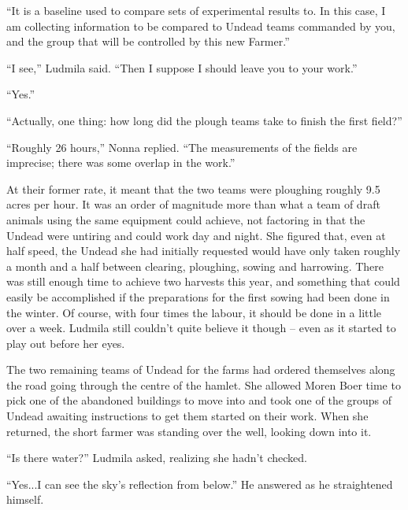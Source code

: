  

“It is a baseline used to compare sets of experimental results to. In this case, I am collecting information to be compared to Undead teams commanded by you, and the group that will be controlled by this new Farmer.”

 

“I see,” Ludmila said. “Then I suppose I should leave you to your work.”

 

“Yes.”

 

“Actually, one thing: how long did the plough teams take to finish the first field?”

 

“Roughly 26 hours,” Nonna replied. “The measurements of the fields are imprecise; there was some overlap in the work.”

 

At their former rate, it meant that the two teams were ploughing roughly 9.5 acres per hour. It was an order of magnitude more than what a team of draft animals using the same equipment could achieve, not factoring in that the Undead were untiring and could work day and night. She figured that, even at half speed, the Undead she had initially requested would have only taken roughly a month and a half between clearing, ploughing, sowing and harrowing. There was still enough time to achieve two harvests this year, and something that could easily be accomplished if the preparations for the first sowing had been done in the winter. Of course, with four times the labour, it should be done in a little over a week. Ludmila still couldn’t quite believe it though – even as it started to play out before her eyes.

 

The two remaining teams of Undead for the farms had ordered themselves along the road going through the centre of the hamlet. She allowed Moren Boer time to pick one of the abandoned buildings to move into and took one of the groups of Undead awaiting instructions to get them started on their work. When she returned, the short farmer was standing over the well, looking down into it.

 

“Is there water?” Ludmila asked, realizing she hadn’t checked.

 

“Yes...I can see the sky’s reflection from below.” He answered as he straightened himself.

